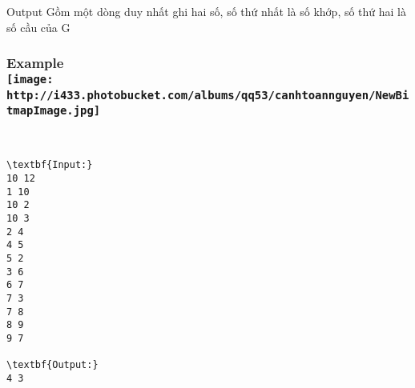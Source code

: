 Output
Gồm một dòng duy nhất ghi hai số, số thứ nhất là số khớp, số thứ hai là số cầu của G

\subsubsection{Example
\\
\texttt{[image: http://i433.photobucket.com/albums/qq53/canhtoannguyen/NewBitmapImage.jpg]}}

 
\begin{verbatim}
\textbf{Input:}
10 12
1 10
10 2
10 3
2 4
4 5
5 2
3 6
6 7
7 3
7 8
8 9
9 7

\textbf{Output:}
4 3\end{verbatim}

 

 

 

 